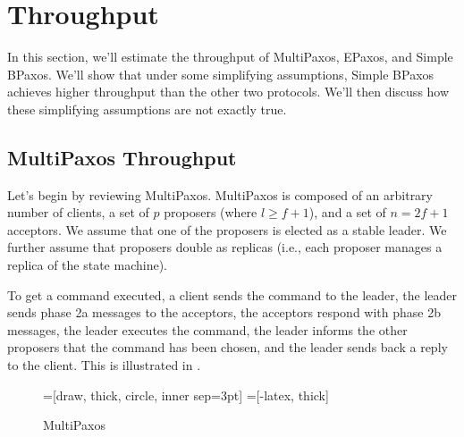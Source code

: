 \section{Throughput}
In this section, we'll estimate the throughput of MultiPaxos, EPaxos, and
Simple BPaxos. We'll show that under some simplifying assumptions, Simple
BPaxos achieves higher throughput than the other two protocols. We'll then
discuss how these simplifying assumptions are not exactly true.

\subsection{MultiPaxos Throughput}
Let's begin by reviewing MultiPaxos. MultiPaxos is composed of an arbitrary
number of clients, a set of $p$ proposers (where $l \geq f + 1$), and a set of
$n = 2f + 1$ acceptors. We assume that one of the proposers is elected as a
stable leader.  We further assume that proposers double as replicas (i.e., each
proposer manages a replica of the state machine).

To get a command executed, a client sends the command to the leader, the leader
sends phase 2a messages to the acceptors, the acceptors respond with phase 2b
messages, the leader executes the command, the leader informs the other
proposers that the command has been chosen, and the leader sends back a reply
to the client. This is illustrated in .

\begin{figure}[ht]
  \centering
  =[draw, thick, circle, inner sep=3pt]
  =[-latex, thick]
  \caption{MultiPaxos}
\end{figure}

